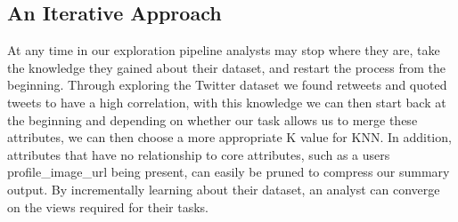 
\subsection{An Iterative Approach}
At any time in our exploration pipeline analysts may stop where they are, take the knowledge they gained about their dataset, and restart the process from the beginning. 
Through exploring the Twitter dataset we found retweets and quoted tweets to have a high correlation, with this knowledge we can then start back at the beginning and depending on whether our task allows us to merge these attributes, we can then choose a more appropriate K value for KNN. 
In addition, attributes that have no relationship to core attributes, such as a users profile\_image\_url being present, can easily be pruned to compress our summary output. 
By incrementally learning about their dataset, an analyst can converge on the views required for their tasks.




